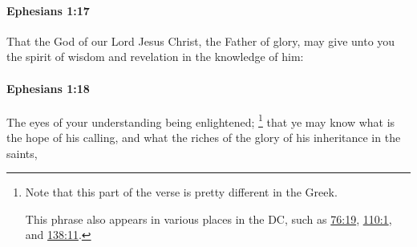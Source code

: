 		\paragraph{Ephesians 1:17} %
			\label{EPHESIANS-1-17}

			That the God of our Lord Jesus Christ, the Father of glory, may give unto you the spirit of wisdom and revelation in the knowledge of him:

			\begin{framed}
			\scriptsize
				\begin{compactdesc}
					\item[SBLG] 
				\end{compactdesc}
			\end{framed}

		\paragraph{Ephesians 1:18} %
			\label{EPHESIANS-1-18}

			The eyes of your understanding being enlightened;%
			\footnote{%
				\label{EPHESIANS-1-18-understanding}%
				Note that this part of the verse is pretty different in the Greek.
				
				This phrase also appears in various places in the DC, such as \hyperref[DC76-19]{76:19}, \hyperref[DC110-1]{110:1}, and \hyperref[DC138-11]{138:11}.
				} 
			that ye may know what is the hope of his calling, and what the riches of the glory of his inheritance in the saints,

